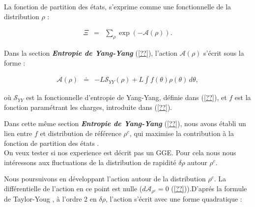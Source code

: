 
La fonction de partition des états, s'exprime comme une fonctionnelle de la distribution \( \rho \) : 

\begin{eqnarray*}
	\Xi & = & \sum_\rho \exp \left( -\mathcal{A}(\rho) \right).
\end{eqnarray*}  

Dans la section {\em \bf Entropie de Yang-Yang} (\ref{??}), l'action \( \mathcal{A}(\rho) \) s'écrit sous la forme :  

\begin{eqnarray*}
	\mathcal{A}(\rho) & \doteq & - L\mathcal{S}_{YY}(\rho) + L\int f(\theta) \rho (\theta) \, d\theta,		
\end{eqnarray*}  

où \( \mathcal{S}_{YY} \) est la fonctionnelle d'entropie de Yang-Yang, définie dans (\ref{??}), et \( f \) est la fonction paramétrant les charges, introduite dans (\ref{??}).  

Dans cette même section {\em \bf Entropie de Yang-Yang} (\ref{??}), nous avons établi un lien entre \( f \) et distribution de référence \( \rho^c \), qui maximise la contribution à la fonction de partition des états .\\

On veux tester si nos experience est décrit pas un GGE. Pour cela nous nous intéressons aux fluctuations de la distribution de rapidité \( \delta \rho \) autour \( \rho^c \).


Nous poursuivons en développant l'action autour de la  distribution  $\rho^c$. La différentielle de l'action en ce point  est nulle ($d\mathcal{A}_{\rho^c} = 0 $ (\ref{??})).D'aprés la formule de Taylor-Youg , à l'ordre 2 en $\delta \rho$,  l'action s'écrit avec une forme quadratique : %

